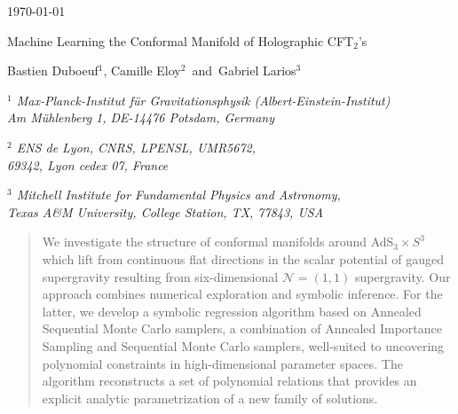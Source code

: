 \documentclass[11pt,a4paper]{article}
\begin{document}
\begin{titlepage}



\begin{flushright}

\today
\end{flushright}


\vspace{25pt}

   
   \begin{center}
   \baselineskip=16pt

{\Large Machine Learning the Conformal Manifold of Holographic CFT$_{2}$’s}


   		
\vspace{25pt}
		

{\large  Bastien Duboeuf$^{1}$, Camille Eloy$^{2}$ \,and\, Gabriel Larios$^{3}$}
		
\vspace{25pt}
		
		
	\begin{small}

	{\it $^{1}$ Max-Planck-Institut f\"ur Gravitationsphysik (Albert-Einstein-Institut)\\ Am M\"uhlenberg 1, DE-14476 Potsdam, Germany}  \\

	\vspace{10pt}

	{\it $^{2}$ ENS de Lyon, CNRS, LPENSL, UMR5672,\\ 69342, Lyon cedex 07, France}  \\


	\vspace{10pt}
	
	{\it $^{3}$ Mitchell Institute for Fundamental Physics and Astronomy, \\
	Texas A\&M University, College Station, TX, 77843, USA}     \\
		
	\end{small}
		

\vskip 50pt

\end{center}

\begin{abstract}
	We investigate the structure of conformal manifolds around AdS$_3 \times S^3$ which lift from continuous flat directions in the scalar potential of gauged supergravity resulting from six-dimensional $\mathcal{N}=(1,1)$ supergravity.
	Our approach combines numerical exploration and symbolic inference. For the latter, we develop a symbolic regression algorithm based on Annealed Sequential Monte Carlo samplers, a combination of Annealed Importance Sampling and Sequential Monte Carlo samplers, well-suited to uncovering polynomial constraints in high-dimensional parameter spaces. 
	The algorithm reconstructs a set of polynomial relations that provides an explicit analytic parametrization of a new family of solutions. 
\end{abstract}


\vfill

\end{titlepage}
\end{document}
